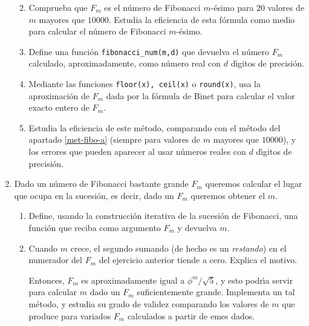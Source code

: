 \begin{ejer}
\begin{enumerate}
\begin{enumerate}
\renewcommand{\theenumi}{}%
\item\label{met-fibo-a} Comprueba que $F_m$ es el n\'umero de Fibonacci
$m$-\'esimo para $20$ valores de $m$ mayores que $10000$. Estudia la eficiencia
de esta f\'ormula como medio para calcular el n\'umero de Fibonacci $m$-\'esimo.

\item Define una función \lstinline|fibonacci_num(m,d)| que devuelva el n\'umero
$F_m$
calculado, aproximadamente,  como n\'umero real con $d$ d\'{\i}gitos de
precisi\'on.

\item Mediante las funciones \lstinline|floor(x), ceil(x)| o
\lstinline|round(x)|, usa la aproximaci\'on de $F_m$ dada por la f\'ormula de
Binet 
para calcular el valor exacto entero de $F_m$.

\item Estudia la eficiencia de este m\'etodo, comparando con el m\'etodo del
apartado
\ref{met-fibo-a} (siempre para valores de $m$ mayores que $10000$), y los
errores que pueden
aparecer al usar n\'umeros reales con $d$ d\'{\i}gitos de precisión. 
\end{enumerate}

\item Dado un n\'umero de Fibonacci bastante grande $F_m$ queremos calcular el
lugar que ocupa en la sucesi\'on, es decir, dado un $F_m$ queremos obtener el
$m$.
\begin{enumerate}
\item Define, usando la construcci\'on iterativa de la sucesi\'on de Fibonacci, 
una funci\'on que reciba como argumento  $F_m$ y devuelva $m$.
    
\item \label{fib-log} Cuando $m$ crece, el segundo sumando (de hecho es un
{\itshape restando})
en el numerador del $F_m$ del ejercicio anterior tiende a cero. Explica el
motivo. 

Entonces, $F_m$ es aproximadamente igual a $\phi^m/ \sqrt{5}$,  y esto
podr\'{\i}a servir para calcular $m$ dado un $F_m$ suficientemente grande.
Implementa un tal m\'etodo, y estudia su grado de validez comparando los valores
de $m$ que produce para variados $F_m$ calculados a partir de emes dados.
\end{enumerate}
\end{enumerate}
\end{ejer}

